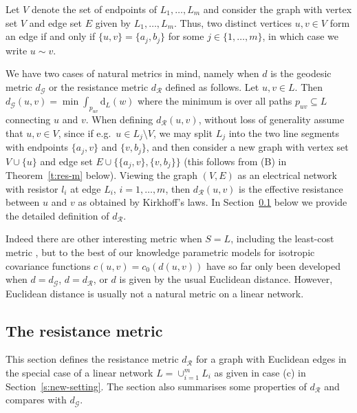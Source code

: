 \documentclass[alpha-refs]{wiley-article}
\begin{document}
Let $V$ denote the set of endpoints of $L_1,\ldots,L_m$ and consider the graph with vertex set $V$ and edge set $E$ given by $L_1,\ldots,L_m$. Thus, two distinct vertices $u,v\in V$ form an edge if and only if $\{u,v\}=\{a_j,b_j\}$ for some $j\in\{1,\ldots,m\}$, in which case we write $u\sim v$. 

We have %
two cases of natural metrics in mind, namely when $d$ is the geodesic metric $d_\mathcal{G}$ or the resistance metric $d_\mathcal{R}$ defined as follows.
Let $u,v\in L$. Then $d_\mathcal{G}(u,v)=\min\int_{p_{uv}}\mathrm d_L(w)$ where the minimum is over all paths $p_{uv}\subseteq L$ connecting $u$ and $v$.
When defining $d_\mathcal{R}(u,v)$, without loss of generality assume that $u,v\in V$, since if e.g.\ $u\in L_j\setminus V$, we may split $L_j$ into the two line segments with endpoints $\{a_j,v\}$ and $\{v,b_j\}$, and then consider a new graph with vertex set $V\cup\{u\}$ and edge set $E\cup\{\{a_j,v\},\{v,b_j\}\}$ (this follows from (B) in Theorem~\ref{t:res-m} below). Viewing the graph $(V,E)$ as an electrical network with resistor $l_i$ at edge $L_i$, $i=1,\ldots,m$, then
$d_\mathcal{R}(u,v)$ is the effective resistance between $u$ and $v$ as obtained by Kirkhoff's laws. 
In Section~\ref{s:res-met} below we provide the detailed definition of $d_\mathcal{R}$.

Indeed there are other interesting metric when $S=L$, including the least-cost metric \citep{RakshitEtAl}, %
but to the best of our knowledge parametric models for isotropic covariance functions $c(u,v)=c_0(d(u,v))$ %
have so far only been developed when $d=d_\mathcal{G}$, $d=d_\mathcal{R}$, or $d$ is given by the usual Euclidean distance. However, Euclidean distance is usually not a natural metric on a linear network.

\subsection{The resistance metric}\label{s:res-met} %

This section defines the resistance metric $d_\mathcal{R}$ for a graph with Euclidean edges \citep{AnderesEtAl} in the special case of
 a linear network $L=\cup_{i=1}^m L_i$ as given in case (c) in Section~\ref{s:new-setting}. The section also summarises some properties of $d_\mathcal{R}$ and compares with $d_\mathcal{G}$. 
 
\end{document}
